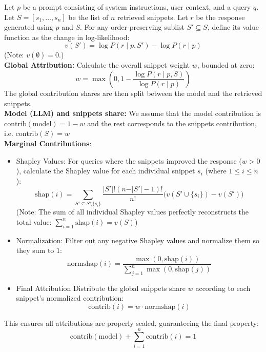 \documentclass{article}
\begin{document}
Let $p$ be a prompt consisting of system instructions, user context, and a query $q$. Let $S = [s_1, \dots, s_n]$ be the list of $n$ retrieved snippets. Let $r$ be the response generated using $p$ and $S$. For any order-preserving sublist $S' \subseteq S$, define its value function as the change in log-likelihood:
$$v(S') = \log P(r \mid p, S') - \log P(r \mid p)$$
(Note: $v(\emptyset) = 0$.)\\
{\bf Global Attribution:} Calculate the overall snippet weight $w$, bounded at zero:
$$w = \max\left(0, 1 - \frac{\log P(r \mid p, S)}{\log P(r \mid p)}\right)$$
The global contribution shares are then split between the model and the retrieved snippets. \\
{\bf Model (LLM) and snippets share:} We assume that the model contribution is $\text{contrib}(\text{model}) = 1 - w$  
and the rest corresponds to the snippets contribution, i.e. $\text{contrib}(S) = w$ \\
{\bf Marginal Contributions}: 
\begin{itemize}
    \item Shapley Values: For queries where the snippets improved the response ($w > 0$), calculate the Shapley value for each individual snippet $s_i$ (where $1 \le i \le n$):
    $$\text{shap}(i) = \sum_{S' \subseteq S \setminus \{s_i\}} \frac{\vert{}S'\vert{}!(n - \vert{}S'\vert{} - 1)!}{n!} \Big( v(S' \cup \{s_i\}) - v(S') \Big)$$
    (Note: The sum of all individual Shapley values perfectly reconstructs the total value: $\sum_{i=1}^n \text{shap}(i) = v(S)$)\\ 
    \item Normalization: Filter out any negative Shapley values and normalize them so they sum to $1$:$$\text{normshap}(i) = \frac{\max(0, \text{shap}(i))}{\sum_{j=1}^n \max(0, \text{shap}(j))}$$
    \item Final Attribution Distribute the global snippets share $w$ according to each snippet's normalized contribution:$$\text{contrib}(i) = w \cdot \text{normshap}(i)$$
\end{itemize}    
This ensures all attributions are properly scaled, guaranteeing the final property:$$\text{contrib}(\text{model}) + \sum_{i=1}^n \text{contrib}(i) = 1$$
\end{document}
